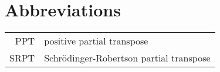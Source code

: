 \section*{Abbreviations} 

\begin{longtable}{rl}
PPT & positive partial transpose\\
SRPT & Schr\"odinger-Robertson partial transpose
\end{longtable}